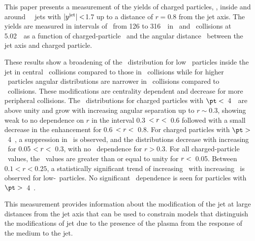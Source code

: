 
This paper presents a measurement of the yields of charged particles, \Dptr, inside and around \RFour\ \antikt\ jets with $|\mbox{$y^{\mathrm{jet}}$}| <$1.7 up to a distance of $r = 0.8$ from the jet axis.
The yields are measured in intervals of \ptjet\ from 126 to 316~\GeV\ in \PbPb\ and \pp\ collisions at 5.02~\TeV\ as a function of charged-particle \pt\ and the angular distance \rvar\ between the jet axis and charged particle.


These results show a broadening of the \Dptr\ distribution for low \pt\ particles inside the jet in central \pbpb\ collisions compared to those in \pp\ collisions while for higher \pt\ particles angular distributions are narrower in \pbpb\ collisions compared to \pp\ collisions.
These modifications are centrality dependent and decrease for more peripheral collisions.
The \RDptr\ distributions for charged particles with $\pt <$~4~\GeV\ are above unity and grow with increasing angular separation up to $r \sim0.3$, showing weak to no dependence on $r$ in the interval 0.3~$< \mbox{$r$} <$~0.6 followed with a small decrease in the enhancement for 0.6~$< \mbox{$r$} <$~0.8.
For charged particles with $\pt >$~4~\GeV, a suppression in \RDptr\ is observed, and the distributions decrease with increasing \rvar\ for 0.05 $ < \mbox{$r$} < $~0.3, with no \rvar\ dependence for $r>0.3$.
For all charged-particle \pt\ values, the \RDptr\ values are greater than or equal to unity for $\mbox{$r$} <$~0.05.
Between $0.1 < r < 0.25$, a statistically significant trend of increasing \RDptr\ with increasing \ptjet\ is observed for low-\pt\ particles.
No significant \ptjet\ dependence is seen for particles  with $\pt >$~4~\GeV.

This measurement provides information about the modification of the jet at large distances from the jet axis that can be used to constrain models that distinguish the modifications of jet due to the presence of the plasma from the response of the medium to the jet.






